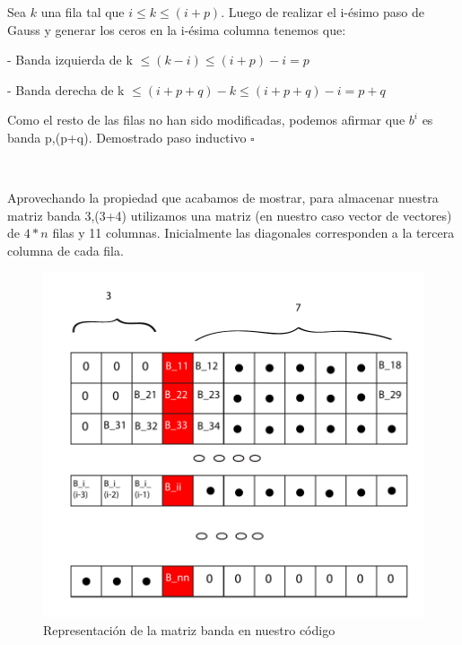 Sea $k$ una fila tal que $i \leq k \leq (i+p)$. Luego de realizar el i-ésimo paso de Gauss y generar los ceros en la 
i-ésima columna tenemos que:

- Banda izquierda de k $\leq (k-i) \leq (i+p)-i = p$

- Banda derecha de k $ \leq (i+p+q)-k \leq (i+p+q)-i = p+q $

Como el resto de las filas no han sido modificadas, podemos afirmar que $b^{i}$ es banda p,(p+q). 
Demostrado paso inductivo $\square$

~

Aprovechando la propiedad que acabamos de mostrar, para almacenar nuestra matriz banda 3,(3+4) utilizamos una
matriz (en nuestro caso vector de vectores) de $4*n$ filas y 11 columnas. Inicialmente las diagonales corresponden
a la tercera columna de cada fila.

\begin{figure}[!h]
	\begin{center}
		  \includegraphics[scale=0.5]{Imagenes/im_13.pdf}
		  \caption{Representación de la matriz banda en nuestro código}
		  \label{fig:contra1}
	\end{center}
\end{figure}
\FloatBarrier
